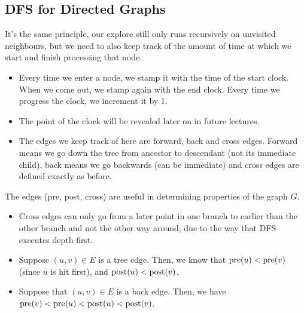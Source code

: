 	\subsection{DFS for Directed Graphs}
	It's the same principle, our explore still only runs recursively on unvisited neighbours, but we need 
	to also keep track of the amount of time at which we start and finish processing that node.
	\begin{itemize}
		\item Every time we enter a node, we stamp it with the time of the start clock. When we come 
			out, we stamp again with the end clock. Every time we progress the clock, we increment it by 1.
		\item The point of the clock will be revealed later on in future lectures. 
		\item The edges we keep track of here are forward, back and cross edges. Forward means we go 
			down the tree from ancestor to descendant (not its immediate child), back means we go backwards 
			(can be immediate) and cross edges are defined exactly as before.
	\end{itemize}
	The edges (pre, post, cross) are useful in determining properties of the graph $G$. 
	\begin{itemize}
		\item Cross edges can only go from a later point in one branch to earlier than the other branch
			and not the other way around, due to the way that DFS executes depth-first.
		\item Suppose $(u, v) \in E$ is a tree edge. Then, we know that $\mathrm{pre}(u) < \mathrm{pre}(v)$ (since $u$ is 
			hit first), and $\mathrm{post}(u) < \mathrm{post}(v)$. 
		\item Suppose that $(u,v)\in E$ is a back edge. Then, we have $\mathrm{pre}(v) < \mathrm{pre}(u) < \mathrm{post}(u) < \mathrm{post}(v)$.
	\end{itemize}